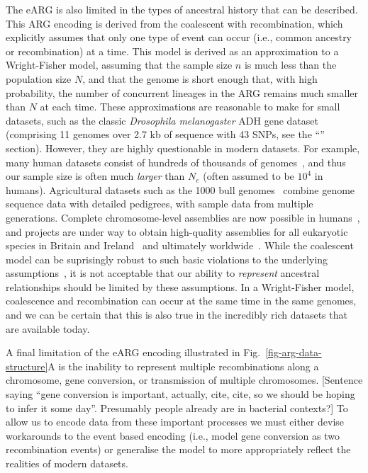 \documentclass{article}
\begin{document}
The eARG is also limited in the types of ancestral history that can
be described. This ARG encoding is derived from the coalescent
with recombination, which explicitly assumes that only one type
of event can occur (i.e., common ancestry or recombination) at a
time. This model is derived as an approximation to a Wright-Fisher
model, assuming that the sample size $n$ is much less than the
population size $N$, and that the genome is short enough that,
with high probability, the number of concurrent lineages in the ARG remains
much smaller than $N$ at each time. These approximations are
reasonable to make for small datasets, such as
the classic \citet{kreitman1983nucleotide} \emph{Drosophila melanogaster}
ADH gene dataset (comprising 11 genomes over 2.7 kb of sequence with 43 SNPs,
see the ``'' section). However,
they are highly questionable in modern datasets. %
For example, many
human datasets consist of hundreds of thousands of
genomes~\citep{bycroft2018genome,karczewski2020mutational,tanjo2021practical},
and thus our sample size is often much \emph{larger} than $N_e$
(often assumed to be $10^4$ in humans).
Agricultural datasets such as the 1000 bull genomes~\citep{hayes20191000}
combine genome sequence data with detailed pedigrees, with
sample data from multiple generations.
Complete chromosome-level assemblies are now possible
in humans~\citep{miga2020telomere},
and projects are under way to obtain high-quality assemblies
for all eukaryotic species in Britain and Ireland~\citep{darwin2022sequence}
and ultimately worldwide~\citep{lewin2022earth}.
While the coalescent model can be suprisingly robust to such
basic violations to the underlying assumptions~\citep{
wakeley2012gene,bhaskar2014distortion,nelson2020accounting},
it is not acceptable that our ability to \emph{represent}
ancestral relationships should be limited by these assumptions.
In a Wright-Fisher model, coalescence and recombination can
occur at the same time in the same genomes, and we can be
certain that this is also true in the incredibly rich
datasets that are available today.

A final limitation of the eARG encoding illustrated in
Fig.~\ref{fig-arg-data-structure}A is the inability to represent
multiple recombinations along a chromosome, gene conversion,
or transmission of multiple chromosomes.
[Sentence saying ``gene conversion is important, actually, cite, cite,
so we should be hoping to infer it some day''. Presumably people
already are in bacterial contexts?]
To allow us to encode data from these important processes we
must either devise workarounds to the event based encoding
(i.e., model gene conversion as two recombination events) or
generalise the model to more appropriately reflect the realities
of modern datasets.
\end{document}
